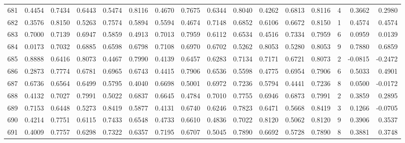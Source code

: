 \begin{tabular}{lrrrrrrrrrrrrrrr}
681 &      0.4454 &  0.7434 &  0.6443 &  0.5474 &  0.8116 &  0.4670 &  0.7675 &  0.6344 &  0.8040 &  0.4262 &   0.6813 &     0.8116 &      4 &                    0.3662 &                     0.2980 \\
682 &      0.3576 &  0.8150 &  0.5263 &  0.7574 &  0.5894 &  0.5594 &  0.4674 &  0.7148 &  0.6852 &  0.6106 &   0.6672 &     0.8150 &      1 &                    0.4574 &                     0.4574 \\
683 &      0.7000 &  0.7139 &  0.6947 &  0.5859 &  0.4913 &  0.7013 &  0.7959 &  0.6112 &  0.6534 &  0.4516 &   0.7334 &     0.7959 &      6 &                    0.0959 &                     0.0139 \\
684 &      0.0173 &  0.7032 &  0.6885 &  0.6598 &  0.6798 &  0.7108 &  0.6970 &  0.6702 &  0.5262 &  0.8053 &   0.5280 &     0.8053 &      9 &                    0.7880 &                     0.6859 \\
685 &      0.8888 &  0.6416 &  0.8073 &  0.4467 &  0.7990 &  0.4139 &  0.6457 &  0.6283 &  0.7134 &  0.7171 &   0.6721 &     0.8073 &      2 &                   -0.0815 &                    -0.2472 \\
686 &      0.2873 &  0.7774 &  0.6781 &  0.6965 &  0.6743 &  0.4415 &  0.7906 &  0.6536 &  0.5598 &  0.4775 &   0.6954 &     0.7906 &      6 &                    0.5033 &                     0.4901 \\
687 &      0.6736 &  0.6564 &  0.6499 &  0.5795 &  0.4040 &  0.6698 &  0.5001 &  0.6972 &  0.7236 &  0.5794 &   0.4441 &     0.7236 &      8 &                    0.0500 &                    -0.0172 \\
688 &      0.4132 &  0.7027 &  0.7991 &  0.5022 &  0.6837 &  0.6645 &  0.4784 &  0.7010 &  0.7755 &  0.6946 &   0.6873 &     0.7991 &      2 &                    0.3859 &                     0.2895 \\
689 &      0.7153 &  0.6448 &  0.5273 &  0.8419 &  0.5877 &  0.4131 &  0.6740 &  0.6246 &  0.7823 &  0.6471 &   0.5668 &     0.8419 &      3 &                    0.1266 &                    -0.0705 \\
690 &      0.4214 &  0.7751 &  0.6115 &  0.7433 &  0.6548 &  0.4733 &  0.6610 &  0.4836 &  0.7022 &  0.8120 &   0.5062 &     0.8120 &      9 &                    0.3906 &                     0.3537 \\
691 &      0.4009 &  0.7757 &  0.6298 &  0.7322 &  0.6357 &  0.7195 &  0.6707 &  0.5045 &  0.7890 &  0.6692 &   0.5728 &     0.7890 &      8 &                    0.3881 &                     0.3748 \\

\end{tabular}
